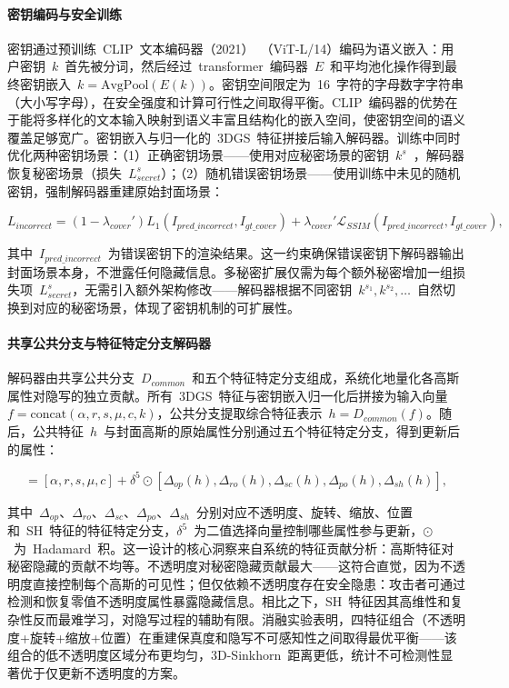 \paragraph{密钥编码与安全训练}密钥通过预训练~CLIP~文本编码器（2021）~\cite{clip_radford2021learning}（ViT-L/14）编码为语义嵌入：用户密钥~$k$~首先被分词，然后经过~transformer~编码器~$E$~和平均池化操作得到最终密钥嵌入~$k = \mathrm{AvgPool}(E(k))$。密钥空间限定为~16~字符的字母数字字符串（大小写字母），在安全强度和计算可行性之间取得平衡。CLIP~编码器的优势在于能将多样化的文本输入映射到语义丰富且结构化的嵌入空间，使密钥空间的语义覆盖足够宽广。密钥嵌入与归一化的~3DGS~特征拼接后输入解码器。训练中同时优化两种密钥场景：（1）正确密钥场景——使用对应秘密场景的密钥~$k^s$~，解码器恢复秘密场景（损失~$L_{secret}^s$）；（2）随机错误密钥场景——使用训练中未见的随机密钥，强制解码器重建原始封面场景：

\begin{equation}
    L_{incorrect} = (1-\lambda_{cover}')L_1(I_{pred\_incorrect}, I_{gt\_cover}) + \lambda_{cover}'\mathcal{L}_{SSIM}(I_{pred\_incorrect}, I_{gt\_cover}),
\end{equation}

其中~$I_{pred\_incorrect}$~为错误密钥下的渲染结果。这一约束确保错误密钥下解码器输出封面场景本身，不泄露任何隐藏信息。多秘密扩展仅需为每个额外秘密增加一组损失项~$L_{secret}^s$，无需引入额外架构修改——解码器根据不同密钥~$k^{s_1}, k^{s_2}, \ldots$~自然切换到对应的秘密场景，体现了密钥机制的可扩展性。

\paragraph{共享公共分支与特征特定分支解码器}解码器由共享公共分支~$D_{common}$~和五个特征特定分支组成，系统化地量化各高斯属性对隐写的独立贡献。所有~3DGS~特征与密钥嵌入归一化后拼接为输入向量~$f = \mathrm{concat}(\alpha, r, s, \mu, c, k)$，公共分支提取综合特征表示~$h = D_{common}(f)$。随后，公共特征~$h$~与封面高斯的原始属性分别通过五个特征特定分支，得到更新后的属性：

\begin{equation}
    [\alpha^*, r^*, s^*, \mu^*, c^*] = [\alpha, r, s, \mu, c] + \delta^5 \odot [\Delta_{op}(h), \Delta_{ro}(h), \Delta_{sc}(h), \Delta_{po}(h), \Delta_{sh}(h)],
\end{equation}

其中~$\Delta_{op}$、$\Delta_{ro}$、$\Delta_{sc}$、$\Delta_{po}$、$\Delta_{sh}$~分别对应不透明度、旋转、缩放、位置和~SH~特征的特征特定分支，$\delta^5$~为二值选择向量控制哪些属性参与更新，$\odot$~为~Hadamard~积。这一设计的核心洞察来自系统的特征贡献分析：高斯特征对秘密隐藏的贡献不均等。不透明度对秘密隐藏贡献最大——这符合直觉，因为不透明度直接控制每个高斯的可见性；但仅依赖不透明度存在安全隐患：攻击者可通过检测和恢复零值不透明度属性暴露隐藏信息。相比之下，SH~特征因其高维性和复杂性反而最难学习，对隐写过程的辅助有限。消融实验表明，四特征组合（不透明度+旋转+缩放+位置）在重建保真度和隐写不可感知性之间取得最优平衡——该组合的低不透明度区域分布更均匀，3D-Sinkhorn~距离更低，统计不可检测性显著优于仅更新不透明度的方案。

